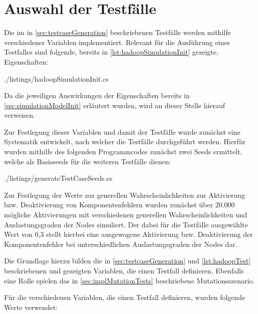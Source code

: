 \section{Auswahl der Testfälle}
\label{sec:selectTestcases}

Die im in \autoref{sec:testcaseGeneration} beschriebenen Testfälle werden mithilfe verschiedener Variablen implementiert.
Relevant für die Ausführung eines Testfalles sind folgende, bereits in \autoref{lst:hadoopSimulationInit} gezeigte, Eigenschaften:


{./listings/hadoopSimulationInit.cs}

Da die jeweiligen Auswirkungen der Eigenschaften bereits in \autoref{sec:simulationModelInit} erläutert wurden, wird an dieser Stelle hierauf verweisen.

Zur Festlegung dieser Variablen und damit der Testfälle wurde zunächst eine Systematik entwickelt, nach welcher die Testfälle durchgeführt werden.
Hierfür wurden mithilfe des folgenden Programmcodes zunächst zwei Seeds ermittelt, welche als Basisseeds für die weiteren Testfälle dienen:


{./listings/generateTestCaseSeeds.cs}

Zur Festlegung der Werte zur generellen Wahrscheinlichkeiten zur Aktivierung bzw. Deaktivierung von Komponentenfehlern wurden zunächst über 20.000 mögliche Aktivierungen mit verschiedenen generellen Wahrscheinlichkeiten und Auslastungsgraden der Nodes simuliert.
Der dabei für die Testfälle ausgewählte Wert von 0,3 stellt hierbei eine ausgewogene Aktivierung bzw. Deaktivierung der Komponentenfehler bei unterschiedlichen Auslastungsgraden der Nodes dar.


Die Grundlage hierzu bilden die in \autoref{sec:testcaseGeneration} und \autoref{lst:hadoopTest} beschriebenen und gezeigten Variablen, die einen Testfall definieren.
Ebenfalls eine Rolle spielen das in \autoref{sec:implMutationTests} beschriebene Mutationsszenario.

Für die verschiedenen Variablen, die einen Testfall definieren, wurden folgende Werte verwendet:

